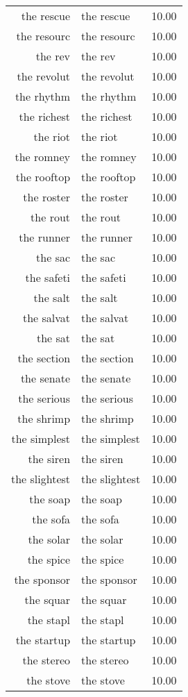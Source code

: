 \begin{table}[ht]
\begin{tabular}{rlr}
  the rescue & the rescue & 10.00 \\ 
  the resourc & the resourc & 10.00 \\ 
  the rev & the rev & 10.00 \\ 
  the revolut & the revolut & 10.00 \\ 
  the rhythm & the rhythm & 10.00 \\ 
  the richest & the richest & 10.00 \\ 
  the riot & the riot & 10.00 \\ 
  the romney & the romney & 10.00 \\ 
  the rooftop & the rooftop & 10.00 \\ 
  the roster & the roster & 10.00 \\ 
  the rout & the rout & 10.00 \\ 
  the runner & the runner & 10.00 \\ 
  the sac & the sac & 10.00 \\ 
  the safeti & the safeti & 10.00 \\ 
  the salt & the salt & 10.00 \\ 
  the salvat & the salvat & 10.00 \\ 
  the sat & the sat & 10.00 \\ 
  the section & the section & 10.00 \\ 
  the senate & the senate & 10.00 \\ 
  the serious & the serious & 10.00 \\ 
  the shrimp & the shrimp & 10.00 \\ 
  the simplest & the simplest & 10.00 \\ 
  the siren & the siren & 10.00 \\ 
  the slightest & the slightest & 10.00 \\ 
  the soap & the soap & 10.00 \\ 
  the sofa & the sofa & 10.00 \\ 
  the solar & the solar & 10.00 \\ 
  the spice & the spice & 10.00 \\ 
  the sponsor & the sponsor & 10.00 \\ 
  the squar & the squar & 10.00 \\ 
  the stapl & the stapl & 10.00 \\ 
  the startup & the startup & 10.00 \\ 
  the stereo & the stereo & 10.00 \\ 
  the stove & the stove & 10.00 \\ 

\end{tabular}
\end{table}
